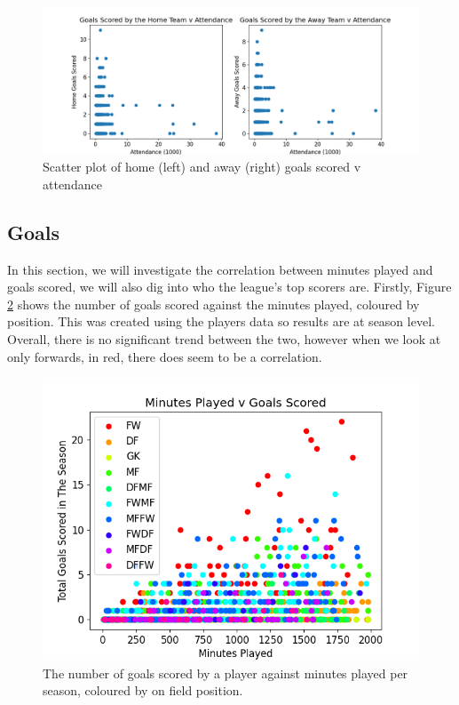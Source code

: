 \documentclass[12pt, a4paper, twocolumn]{article}
\begin{document}
\begin{figure}
  \includegraphics[width=\linewidth]{../vis/fixtures/attendance_v_goals.png}
  \caption{Scatter plot of home (left) and away (right) goals scored v attendance}
  \label{att_v_goals}
\end{figure}

\subsection{Goals}

In this section, we will investigate the correlation between minutes played and goals scored, we will also dig into who the league's top scorers are. Firstly, Figure \ref{goal_min} shows the number of goals scored against the minutes played, coloured by position. This was created using the players data so results are at season level. Overall, there is no significant trend between the two, however when we look at only forwards, in red, there does seem to be a correlation.

\begin{figure}
  \includegraphics[width=\linewidth]{../vis/playerStats/goal_minutes}
  \caption{The number of goals scored by a player against minutes played per season, coloured by on field position.}
  \label{goal_min}
\end{figure}
\end{document}
